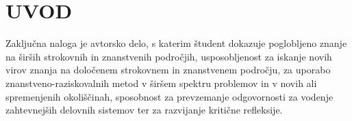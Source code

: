 \chapter{UVOD}

Zaključna naloga je avtorsko delo, s katerim študent dokazuje poglobljeno znanje na širših
strokovnih in znanstvenih področjih, usposobljenost za iskanje novih virov znanja na
določenem strokovnem in znanstvenem področju, za uporabo znanstveno-raziskovalnih
metod v širšem spektru problemov in v novih ali spremenjenih okoliščinah, sposobnost za
prevzemanje odgovornosti za vodenje zahtevnejših delovnih sistemov ter za razvijanje
kritične refleksije.